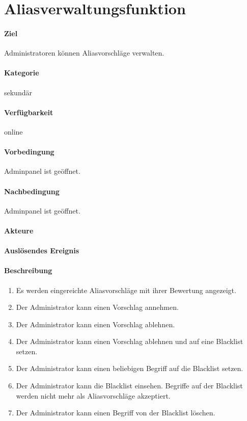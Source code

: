 \section{Aliasverwaltungsfunktion}
\label{Aliasverwaltungsfunktion}
\paragraph{Ziel}
Administratoren können Aliasvorschläge verwalten.
\paragraph{Kategorie}
sekundär
\paragraph{Verfügbarkeit}
online
\paragraph{Vorbedingung}
Adminpanel ist geöffnet.
\paragraph{Nachbedingung}
Adminpanel ist geöffnet.
\paragraph{Akteure}

\paragraph{Auslösendes Ereignis}

\paragraph{Beschreibung}
\begin{enumerate}
    \item Es werden eingereichte Aliasvorschläge mit ihrer Bewertung angezeigt.
    \item Der Administrator kann einen Vorschlag annehmen.
    \item Der Administrator kann einen Vorschlag ablehnen.
    \item Der Administrator kann einen Vorschlag ablehnen und auf eine Blacklist setzen.
    \item Der Administrator kann einen beliebigen Begriff auf die Blacklist setzen.
    \item Der Administrator kann die Blacklist einsehen. Begriffe auf der Blacklist werden nicht mehr als Aliasvorschläge akzeptiert.
    \item Der Administrator kann einen Begriff von der Blacklist löschen.
\end{enumerate}